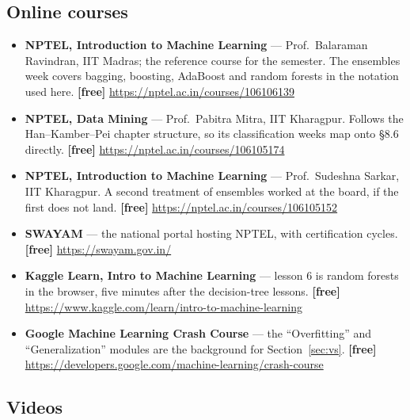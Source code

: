 \documentclass[11pt]{article}
\begin{document}
\subsection*{Online courses}

\begin{sloppypar}
\begin{itemize}[leftmargin=*]
  \item \textbf{NPTEL, Introduction to Machine Learning} --- Prof.\ Balaraman
    Ravindran, IIT Madras; the reference course for the semester. The
    ensembles week covers bagging, boosting, AdaBoost and random forests in
    the notation used here. \textbf{[free]}
    \url{https://nptel.ac.in/courses/106106139}
  \item \textbf{NPTEL, Data Mining} --- Prof.\ Pabitra Mitra, IIT Kharagpur.
    Follows the Han--Kamber--Pei chapter structure, so its classification
    weeks map onto \S8.6 directly. \textbf{[free]}
    \url{https://nptel.ac.in/courses/106105174}
  \item \textbf{NPTEL, Introduction to Machine Learning} --- Prof.\ Sudeshna
    Sarkar, IIT Kharagpur. A second treatment of ensembles worked at the
    board, if the first does not land. \textbf{[free]}
    \url{https://nptel.ac.in/courses/106105152}
  \item \textbf{SWAYAM} --- the national portal hosting NPTEL, with
    certification cycles. \textbf{[free]} \url{https://swayam.gov.in/}
  \item \textbf{Kaggle Learn, Intro to Machine Learning} --- lesson 6 is
    random forests in the browser, five minutes after the decision-tree
    lessons. \textbf{[free]}
    \url{https://www.kaggle.com/learn/intro-to-machine-learning}
  \item \textbf{Google Machine Learning Crash Course} --- the ``Overfitting''
    and ``Generalization'' modules are the background for
    Section~\ref{sec:vs}. \textbf{[free]}
    \url{https://developers.google.com/machine-learning/crash-course}
\end{itemize}
\end{sloppypar}

\subsection*{Videos}
\end{document}
